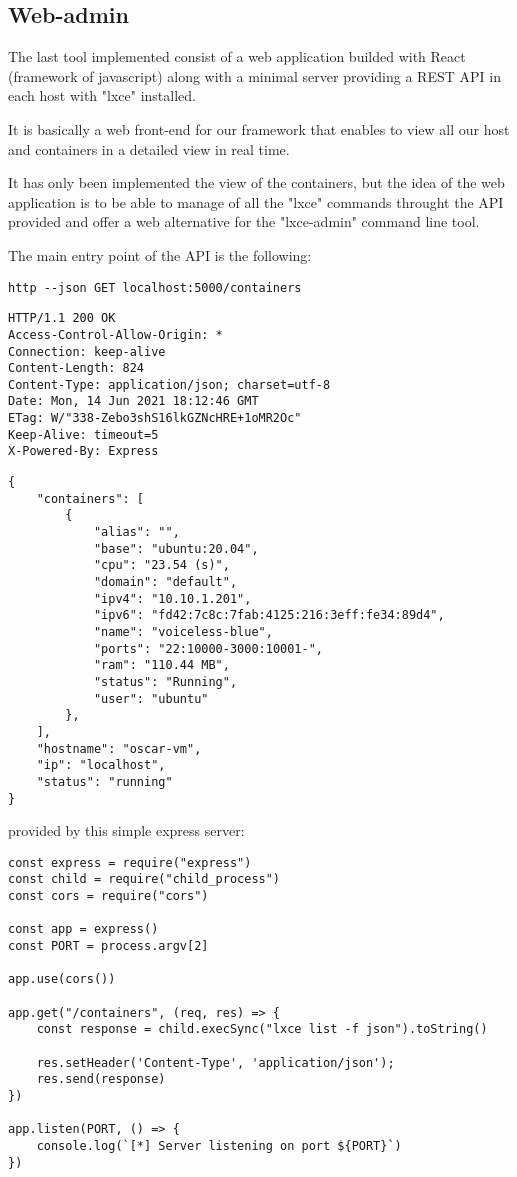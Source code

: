 \newpage
\subsection{Web-admin}
The last tool implemented consist of a web application builded with React (framework of javascript) along with a minimal server providing a REST API in each host with "lxce" installed.

It is basically a web front-end for our framework that enables to view all our host and containers in a detailed view in real time.

It has only been implemented the view of the containers, but the idea of the web application is to be able to manage of all the "lxce" commands throught the API provided and offer a web alternative for the "lxce-admin" command line tool.

The main entry point of the API is the following:
\begin{verbatim}
http --json GET localhost:5000/containers
\end{verbatim}
\begin{verbatim}
HTTP/1.1 200 OK
Access-Control-Allow-Origin: *
Connection: keep-alive
Content-Length: 824
Content-Type: application/json; charset=utf-8
Date: Mon, 14 Jun 2021 18:12:46 GMT
ETag: W/"338-Zebo3shS16lkGZNcHRE+1oMR2Oc"
Keep-Alive: timeout=5
X-Powered-By: Express
\end{verbatim}
\begin{verbatim}
{
    "containers": [
        {
            "alias": "",
            "base": "ubuntu:20.04",
            "cpu": "23.54 (s)",
            "domain": "default",
            "ipv4": "10.10.1.201",
            "ipv6": "fd42:7c8c:7fab:4125:216:3eff:fe34:89d4",
            "name": "voiceless-blue",
            "ports": "22:10000-3000:10001-",
            "ram": "110.44 MB",
            "status": "Running",
            "user": "ubuntu"
        },
    ],
    "hostname": "oscar-vm",
    "ip": "localhost",
    "status": "running"
}
\end{verbatim}

provided by this simple express server:
\begin{verbatim}
const express = require("express")
const child = require("child_process")
const cors = require("cors")

const app = express()
const PORT = process.argv[2]

app.use(cors())

app.get("/containers", (req, res) => {
    const response = child.execSync("lxce list -f json").toString()

    res.setHeader('Content-Type', 'application/json');
    res.send(response)
})

app.listen(PORT, () => {
    console.log(`[*] Server listening on port ${PORT}`)
})

\end{verbatim}




